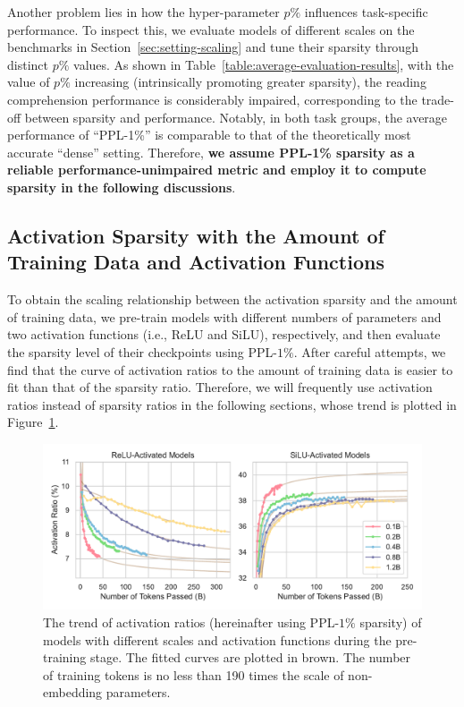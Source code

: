 \documentclass{article} %
\begin{document}
Another problem lies in how the hyper-parameter $p\%$ influences task-specific performance. To inspect this, we evaluate models of different scales on the benchmarks in Section~\ref{sec:setting-scaling} and tune their sparsity through distinct $p\%$ values.
As shown in Table~\ref{table:average-evaluation-results}, with the value of $p\%$ increasing (intrinsically promoting greater sparsity), the reading comprehension performance is considerably impaired, corresponding to the trade-off between sparsity and performance. Notably, in both task groups, the average performance of ``PPL-1\%'' is comparable to that of the theoretically most accurate ``dense'' setting. Therefore, \textbf{we assume PPL-1\% sparsity as a reliable performance-unimpaired metric and employ it to compute sparsity in the following discussions}.

\subsection{Activation Sparsity with the Amount of Training Data and Activation Functions} \label{sec:data-activation}

To obtain the scaling relationship between the activation sparsity and the amount of training data, we pre-train models with different numbers of parameters and two activation functions (i.e., ReLU and SiLU), respectively, and then evaluate the sparsity level of their checkpoints using PPL-$1\%$. After careful attempts, we find that the curve of activation ratios to the amount of training data is easier to fit than that of the sparsity ratio. Therefore, we will frequently use activation ratios instead of sparsity ratios in the following sections, whose trend is plotted in Figure~\ref{fig:pre-training-activation}.

\begin{figure}[t]
    \centering
    \includegraphics[width=0.9\linewidth]{figures/pretrain-activation.pdf}
    \caption{The trend of activation ratios (hereinafter using PPL-$1\%$ sparsity) of models with different scales and activation functions during the pre-training stage. The fitted curves are plotted in brown. The number of training tokens is no less than 190 times the scale of non-embedding parameters.}
    \label{fig:pre-training-activation}
\end{figure}
\end{document}
